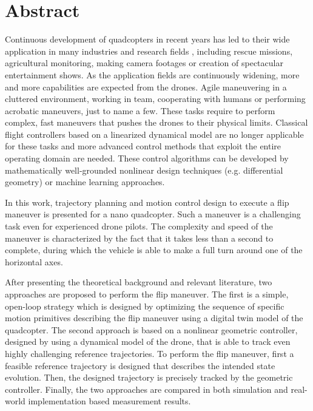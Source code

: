\section*{Abstract}
Continuous development of quadcopters in recent years has led to their wide application in many industries and research fields%
, including rescue missions, agricultural monitoring, making camera footages or creation of spectacular entertainment shows.
As the application fields are continuously widening, more and more capabilities are expected from the drones. Agile maneuvering in a cluttered environment, working in team, cooperating with humans or performing acrobatic maneuvers, just to name a few. These tasks require to perform complex, fast maneuvers that pushes the drones to their physical limits. Classical flight controllers based on a linearized dynamical model are no longer applicable for these tasks and more advanced control methods that exploit the entire operating domain are needed. These control algorithms can be developed by mathematically well-grounded nonlinear design techniques (e.g. differential geometry) or machine learning approaches.

In this work, trajectory planning and motion control design to execute a flip maneuver is presented for a nano quadcopter. Such a maneuver is a challenging task even for experienced drone pilots. The complexity and speed of the maneuver is characterized by the fact that it takes less than a second to complete, during which the vehicle is able to make a full turn around one of the horizontal axes.

After presenting the theoretical background and relevant literature, two approaches are proposed to perform the flip maneuver. The first is a simple, open-loop strategy which is designed by optimizing the sequence of specific motion primitives describing the flip maneuver using a digital twin model of the quadcopter. The second approach is based on a nonlinear geometric controller, designed by using a dynamical model of the drone, that is able to track even highly challenging reference trajectories. To perform the flip maneuver, first a feasible reference trajectory is designed that describes the intended state evolution. Then, the designed trajectory is precisely tracked by the geometric controller. Finally, the two approaches are compared in both simulation and real-world implementation based measurement results.
\pagebreak